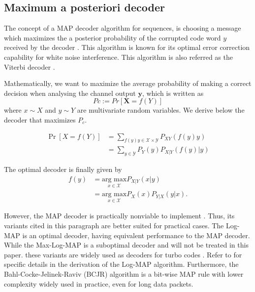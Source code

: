 \documentclass[conference]{IEEEtran}
\begin{document}
\subsection{Maximum a posteriori decoder}


The concept of a MAP decoder algorithm for sequences, is choosing a message which maximizes the a posterior probability of the corrupted code word $y$ received by the decoder \cite{Worm00turbo-decodingwithout}. This algorithm is known for its optimal error correction capability for white noise interference. This algorithm is also referred as the Viterbi decoder \cite{Viterbi}.

Mathematically, we want to maximize the average probability of making a correct decision when analysing the channel output $\textbf{y}$, which is written as
\begin{equation}\label{eq:MAP1}
Pc := Pr[\textbf{X}=f({Y})]
\end{equation}
where $x \sim X$ and $y \sim Y$ are multivariate random variables. We derive below the decoder that maximizes $P_c$.

\begin{align} 
\Pr \left[ X=f\left( Y\right) \right]& =\sum_{f\left( y\right) y\in \mathcal{X}\times \mathcal{Y}} P_{XY}(f(y)y) \label{eq:MAP2} \\
&=\sum _{y\in \mathcal{Y}}P_{Y}\left( y\right)P_{X|Y}\left( f(y)|y\right) \label{eq:MAP3}
\end{align}

The optimal decoder is finally given by
\begin{align}
f(y) &= \underset{x\in \mathcal{X}}{\text{arg max}} P_{X|Y}(x|y)\label{eq:MAPF1}\\
&= \underset{x\in \mathcal{X}}{\text{arg max}}
P_X(x)P_{Y|X}(y|x).\label{eq:MAPF2}
\end{align}

However, the MAP decoder is practically nonviable to implement \cite{journals/ett/RobertsonHV97}. Thus, its variants cited in this paragraph are better suited for practical cases. The Log-MAP is an optimal decoder, having equivalent performance to the MAP decoder. While the Max-Log-MAP is a suboptimal decoder and will not be treated in this paper.  these variants are widely used as decoders for turbo codes \cite{HagenauerJ}. Refer to \cite{journals/ett/RobertsonHV97} for specific details in the derivation of the Log-MAP algorithm. Furthermore, the Bahl-Cocke-Jelinek-Raviv (BCJR) algorithm is a bit-wise MAP rule with lower complexity widely used in practice, even for long data packets.
\end{document}
